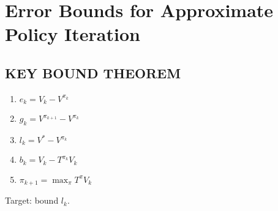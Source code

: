 \documentclass[a4paper]{article}
\begin{document}
\section{Error Bounds for Approximate Policy Iteration}%

\subsection{KEY BOUND THEOREM}%

\begin{enumerate}
    \item $ e_k = V_k - V^{\pi_k} $
    \item $ g_k = V^{\pi_{k+1}} - V^{\pi_k} $
    \item $ l_k = V^* - V^{\pi_k} $
    \item $ b_k = V_k - T^{\pi_k} V_k $
        \item $ \pi_{k+1} = \max_{\pi} T^{\pi} V_k $
\end{enumerate}
Target: bound $ l_k $.
\end{document}
